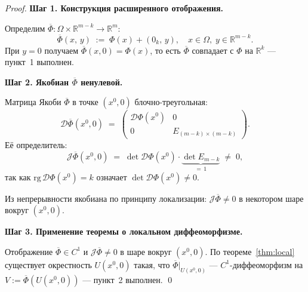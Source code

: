 \begin{proof}
  \textbf{Шаг 1. Конструкция расширенного отображения.}

  Определим $\overline{\Phi} : \Omega \times \mathbb{R}^{m-k} \to \mathbb{R}^m$:
  \[
    \overline{\Phi}(x,\, y) \;:=\; \Phi(x) + (0_k,\, y),
    \quad x \in \Omega,\; y \in \mathbb{R}^{m-k}.
  \]
  При $y = 0$ получаем $\overline{\Phi}(x, 0) = \Phi(x)$, то есть
  $\overline{\Phi}$ совпадает с $\Phi$ на $\mathbb{R}^k$ --- пункт~1 выполнен.

  \medskip
  \textbf{Шаг 2. Якобиан $\overline{\Phi}$ ненулевой.}

  Матрица Якоби $\overline{\Phi}$ в точке $(x^0, 0)$ блочно-треугольная:
  \[
    \mathcal{D}\overline{\Phi}(x^0, 0)
    \;=\;
    \begin{pmatrix}
      \mathcal{D}\Phi(x^0) & 0 \\[4pt]
      0 & E_{(m-k)\times(m-k)}
    \end{pmatrix}.
  \]
  Её определитель:
  \[
    \mathcal{J}\overline{\Phi}(x^0, 0)
    \;=\; \det\mathcal{D}\Phi(x^0) \cdot \underbrace{\det E_{m-k}}_{=\,1}
    \;\neq\; 0,
  \]
  так как $\mathrm{rg}\,\mathcal{D}\Phi(x^0) = k$ означает
  $\det\mathcal{D}\Phi(x^0) \neq 0$.

  Из непрерывности якобиана по принципу локализации:
  $\mathcal{J}\overline{\Phi} \neq 0$ в некотором шаре вокруг $(x^0, 0)$.

  \medskip
  \textbf{Шаг 3. Применение теоремы о локальном диффеоморфизме.}

  Отображение $\overline{\Phi} \in C^1$ и $\mathcal{J}\overline{\Phi} \neq 0$
  в шаре вокруг $(x^0, 0)$. По теореме~\ref{thm:local} существует
  окрестность $U(x^0, 0)$ такая, что $\overline{\Phi}\big|_{U(x^0,0)}$
  --- $C^1$-диффеоморфизм на $V := \overline{\Phi}(U(x^0,0))$ --- пункт~2
  выполнен. \qed
\end{proof}



